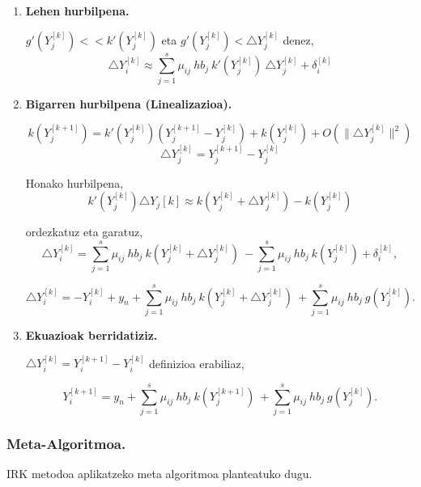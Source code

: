 \begin{enumerate}
\item \textbf{Lehen hurbilpena.}

$g'(Y_{j}^{[k]}) << k'(Y_{j}^{[k]})$  eta $g'(Y_{j}^{[k]})<\triangle Y_{j}^{[k]}$ denez,
\begin{equation}
\triangle Y_i^{[k]} \approx \sum\limits_{j=1}^{s} \mu_{ij} \ hb_j \ k'(Y_{j}^{[k]}) \ \triangle Y_j^{[k]}+\delta_i^{[k]}
\end{equation}  

\item \textbf{Bigarren hurbilpena (Linealizazioa).}

\begin{equation*}
k(Y_{j}^{[k+1]})=k'(Y_{j}^{[k]}) (Y_{j}^{[k+1]}-Y_{j}^{[k]})+k(Y_{j}^{[k]})+O(\|\triangle Y_j^{[k]}\|^2)
\end{equation*}
\begin{equation*}
\triangle Y_j^{[k]}=Y_j^{[k+1]}-Y_j^{[k]}
\end{equation*}

Honako hurbilpena,
\begin{equation*}
k'(Y_j^{[k]}) \triangle Y_j{[k]} \approx k(Y_j^{[k]}+\triangle Y_j^{[k]})- k(Y_j^{[k]})
\end{equation*}

ordezkatuz eta garatuz,
\begin{equation*}
\triangle Y_i^{[k]}=\sum\limits_{j=1}^{s} \mu_{ij} \ hb_j \ k(Y_j^{[k]}+\triangle Y_j^{[k]})\ -\sum\limits_{j=1}^{s} \mu_{ij} \ hb_j \ k(Y_j^{[k]}) +\delta_i^{[k]},
\end{equation*}

\begin{equation}
\triangle Y_i^{[k]}=-Y_i^{[k]}+y_n+ \sum\limits_{j=1}^{s} \mu_{ij} \ hb_j \ k(Y_j^{[k]}+\triangle Y_j^{[k]})\  +\sum\limits_{j=1}^{s} \mu_{ij} \ hb_j \ g(Y_{j}^{[k]}).
\end{equation}

\item \textbf{Ekuazioak berridatiziz.}

$\triangle Y_i^{[k]}=Y_i^{[k+1]}-Y_i^{[k]}$ definizioa erabiliaz,

\begin{equation}
Y_i^{[k+1]}=y_n+ \sum\limits_{j=1}^{s} \mu_{ij} \ hb_j \ k(Y_j^{[k+1]})\  +\sum\limits_{j=1}^{s} \mu_{ij} \ hb_j \ g(Y_{j}^{[k]}).
\end{equation}
\end{enumerate}


\subsubsection*{Meta-Algoritmoa.}
IRK metodoa aplikatzeko meta algoritmoa planteatuko dugu.

